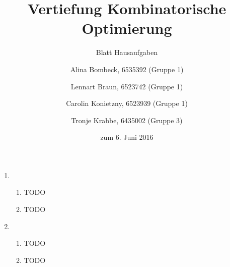 \documentclass[a4paper]{scrartcl}
\title{Vertiefung Kombinatorische Optimierung}
\subtitle{Blatt {\blattnr} Hausaufgaben}
\author{%
    Alina Bombeck, 6535392 (Gruppe 1) \and
    Lennart Braun, 6523742 (Gruppe 1) \and
    Carolin Konietzny, 6523939 (Gruppe 1) \and
    Tronje Krabbe, 6435002 (Gruppe 3)
}
\date{zum 6. Juni 2016}
\begin{document}
\maketitle


\begin{enumerate}[label=\bfseries \arabic*.]
\item %
\begin{enumerate}
    \item %
        TODO
    \item %
        TODO

\end{enumerate}

\item %
\begin{enumerate}
    \item %
        TODO

    \item %
        TODO

\end{enumerate}
\end{enumerate}
\end{document}
